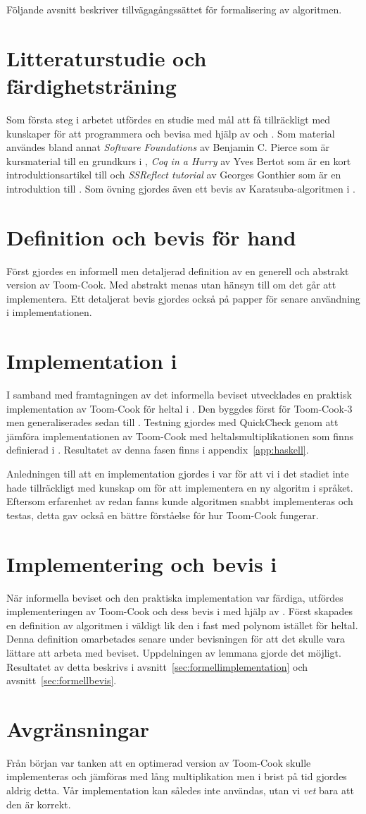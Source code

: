 Följande avsnitt beskriver tillvägagångssättet för formalisering av algoritmen.

\section{Litteraturstudie och färdighetsträning}
Som första steg i arbetet utfördes en studie med mål att få tillräckligt med
kunskaper för att programmera och bevisa med hjälp av \coq{} och \ssr{}. Som
material användes bland annat \emph{Software Foundations} av Benjamin C. Pierce
som är kursmaterial till en grundkurs i \coq{}, \emph{Coq in a Hurry} av Yves
Bertot som är en kort introduktionsartikel till \coq{} och \emph{SSReflect
tutorial} av Georges Gonthier som är en introduktion till \ssr{}. Som övning
gjordes även ett bevis av Karatsuba-algoritmen i \coq{}.

\section{Definition och bevis för hand}
Först gjordes en informell men detaljerad definition av en generell och
abstrakt version av Toom-Cook. Med abstrakt menas utan hänsyn till om det går
att implementera. Ett detaljerat bevis gjordes också på papper för senare
användning i implementationen.

\section{Implementation i \haskell{}}
I samband med framtagningen av det informella beviset utvecklades en praktisk
implementation av Toom-Cook för heltal i \haskell{}. Den byggdes först för
Toom-Cook-3 men generaliserades sedan till . Testning gjordes med
QuickCheck genom att jämföra implementationen av Toom-Cook med
heltalsmultiplikationen som finns definierad i \haskell{}. Resultatet av denna
fasen finns i appendix~\ref{app:haskell}.

Anledningen till att en implementation gjordes i \haskell{} var för att vi i det
stadiet inte hade tillräckligt med kunskap om \coq{} för att implementera en ny
algoritm i språket. Eftersom erfarenhet av \haskell{} redan fanns kunde algoritmen
snabbt implementeras och testas, detta gav också en bättre förståelse för hur
Toom-Cook fungerar.

\section{Implementering och bevis i \coq{}}
När informella beviset och den praktiska implementation var färdiga, utfördes
implementeringen av Toom-Cook och dess bevis i \coq{} med hjälp av \ssr{}.
Först skapades en definition av algoritmen i \coq{} väldigt lik den i
\haskell{} fast med polynom istället för heltal. Denna definition omarbetades
senare under bevisningen för att det skulle vara lättare att arbeta med
beviset. Uppdelningen av lemmana gjorde det möjligt. Resultatet av detta
beskrivs i avsnitt~\ref{sec:formellimplementation} och
avsnitt~\ref{sec:formellbevis}.

\section{Avgränsningar}
Från början var tanken att en optimerad version av Toom-Cook skulle
implementeras och jämföras med lång multiplikation men i brist på tid gjordes
aldrig detta. Vår implementation kan således inte användas, utan vi \emph{vet}
bara att den är korrekt.
